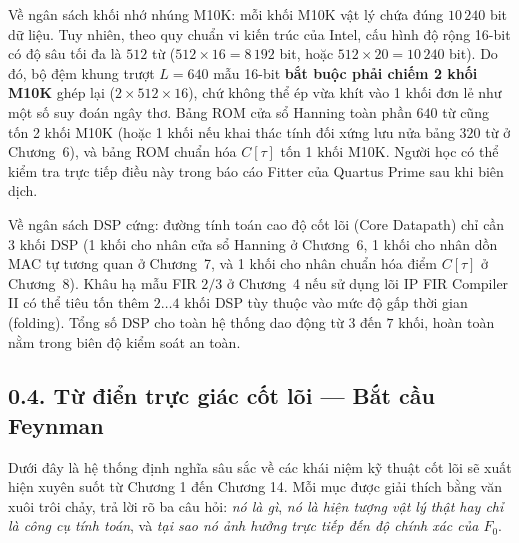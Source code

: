 Về ngân sách khối nhớ nhúng M10K: mỗi khối M10K vật lý chứa đúng $10\,240$ bit dữ liệu. Tuy nhiên, theo quy chuẩn vi kiến trúc của Intel, cấu hình độ rộng 16-bit có độ sâu tối đa là $512$ từ ($512 \times 16 = 8\,192$ bit, hoặc $512 \times 20 = 10\,240$ bit). Do đó, bộ đệm khung trượt $L = 640$ mẫu 16-bit \textbf{bắt buộc phải chiếm 2 khối M10K} ghép lại ($2 \times 512 \times 16$), chứ không thể ép vừa khít vào 1 khối đơn lẻ như một số suy đoán ngây thơ. Bảng ROM cửa sổ Hanning toàn phần $640$ từ cũng tốn 2 khối M10K (hoặc 1 khối nếu khai thác tính đối xứng lưu nửa bảng $320$ từ ở Chương~6), và bảng ROM chuẩn hóa $C[\tau]$ tốn 1 khối M10K. Người học có thể kiểm tra trực tiếp điều này trong báo cáo Fitter của Quartus Prime sau khi biên dịch.

Về ngân sách DSP cứng: đường tính toán cao độ cốt lõi (Core Datapath) chỉ cần 3 khối DSP (1 khối cho nhân cửa sổ Hanning ở Chương~6, 1 khối cho nhân dồn MAC tự tương quan ở Chương~7, và 1 khối cho nhân chuẩn hóa điểm $C[\tau]$ ở Chương~8). Khâu hạ mẫu FIR $2/3$ ở Chương~4 nếu sử dụng lõi IP FIR Compiler II có thể tiêu tốn thêm $2 \ldots 4$ khối DSP tùy thuộc vào mức độ gấp thời gian (folding). Tổng số DSP cho toàn hệ thống dao động từ $3$ đến $7$ khối, hoàn toàn nằm trong biên độ kiểm soát an toàn.

\subsection*{0.4. Từ điển trực giác cốt lõi --- Bắt cầu Feynman}

Dưới đây là hệ thống định nghĩa sâu sắc về các khái niệm kỹ thuật cốt lõi sẽ xuất hiện xuyên suốt từ Chương 1 đến Chương 14. Mỗi mục được giải thích bằng văn xuôi trôi chảy, trả lời rõ ba câu hỏi: \emph{nó là gì}, \emph{nó là hiện tượng vật lý thật hay chỉ là công cụ tính toán}, và \emph{tại sao nó ảnh hưởng trực tiếp đến độ chính xác của $F_0$}.

